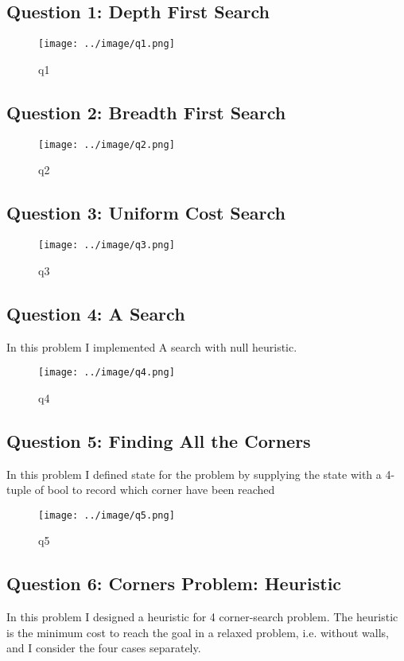 \documentclass{article}
\begin{document}
\subsection{Question 1: Depth First Search}
\begin{figure}[H]
    \centering
    \texttt{[image: ../image/q1.png]}
    \caption{q1}
    \label{fig:q1}
\end{figure}

\subsection{Question 2: Breadth First Search}
\begin{figure}[H]
    \centering
    \texttt{[image: ../image/q2.png]}
    \caption{q2}
    \label{fig:q2}
\end{figure}

\subsection{Question 3: Uniform Cost Search}
\begin{figure}[H]
    \centering
    \texttt{[image: ../image/q3.png]}
    \caption{q3}
    \label{fig:q3}
\end{figure}

\subsection{Question 4: A\* Search}
In this problem I implemented A\* search with null heuristic.

\begin{figure}[H]
    \centering
    \texttt{[image: ../image/q4.png]}
    \caption{q4}
    \label{fig:q4}
\end{figure}

\subsection{Question 5: Finding All the Corners}
In this problem I defined state for the problem by supplying the state with a 4-tuple of bool to record which corner have been reached

\begin{figure}[H]
    \centering
    \texttt{[image: ../image/q5.png]}
    \caption{q5}
    \label{fig:q5}
\end{figure}

\subsection{Question 6: Corners Problem: Heuristic}
In this problem I designed a heuristic for 4 corner-search problem.
The heuristic is the minimum cost to reach the goal in a relaxed problem, i.e. without walls, 
 and I consider the four cases separately.
\end{document}
